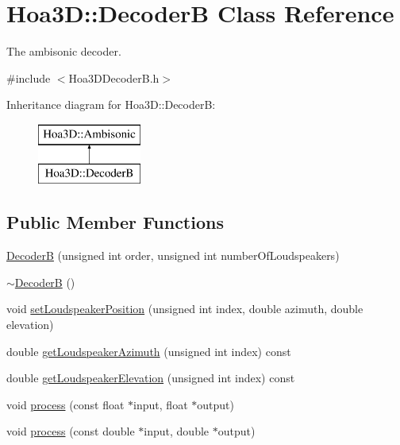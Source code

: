 \hypertarget{class_hoa3_d_1_1_decoder_b}{\section{Hoa3\-D\-:\-:Decoder\-B Class Reference}
\label{class_hoa3_d_1_1_decoder_b}
}


The ambisonic decoder.  




{\ttfamily \#include $<$Hoa3\-D\-Decoder\-B.\-h$>$}

Inheritance diagram for Hoa3\-D\-:\-:Decoder\-B\-:\begin{figure}[H]
\begin{center}
\leavevmode
\includegraphics[height=2.000000cm]{class_hoa3_d_1_1_decoder_b}
\end{center}
\end{figure}
\subsection*{Public Member Functions}
\begin{DoxyCompactItemize}
\item 
\hyperlink{class_hoa3_d_1_1_decoder_b_ae494cd9dc82da175fec7050f24008c73}{Decoder\-B} (unsigned int order, unsigned int number\-Of\-Loudspeakers)
\item 
\hyperlink{class_hoa3_d_1_1_decoder_b_aec24bdc8725c06122a54327a2bfeb835}{$\sim$\-Decoder\-B} ()
\item 
void \hyperlink{class_hoa3_d_1_1_decoder_b_a3c04d817809357966c8457798e9c7faa}{set\-Loudspeaker\-Position} (unsigned int index, double azimuth, double elevation)
\item 
double \hyperlink{class_hoa3_d_1_1_decoder_b_a27ae29036a4dcdad33672130731cfa95}{get\-Loudspeaker\-Azimuth} (unsigned int index) const 
\item 
double \hyperlink{class_hoa3_d_1_1_decoder_b_a021ff017ae3e63fad9e002c02126d5f0}{get\-Loudspeaker\-Elevation} (unsigned int index) const 
\item 
void \hyperlink{class_hoa3_d_1_1_decoder_b_a5c7f32cca74da2c6a46f469188b78358}{process} (const float $\ast$input, float $\ast$output)
\item 
void \hyperlink{class_hoa3_d_1_1_decoder_b_abba8a06644f7c582aeeb795587203ee8}{process} (const double $\ast$input, double $\ast$output)
\end{DoxyCompactItemize}


